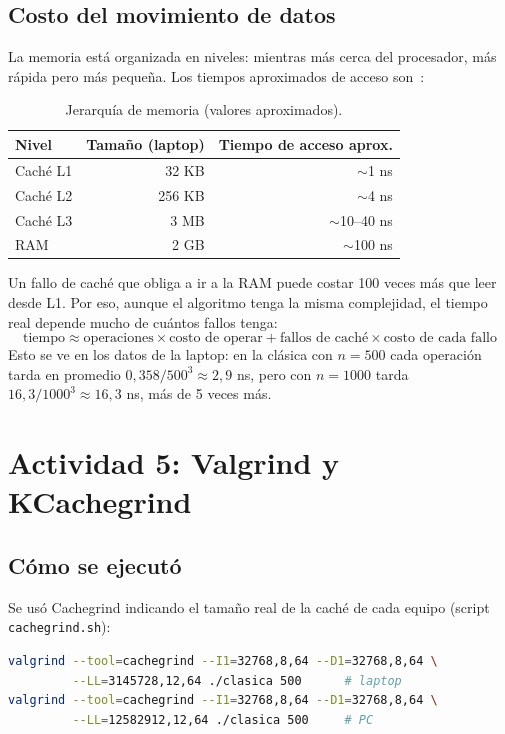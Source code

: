 \documentclass[11pt]{article}
\begin{document}
\subsection{Costo del movimiento de datos}

La memoria está organizada en niveles: mientras más cerca del procesador, más
rápida pero más pequeña. Los tiempos aproximados de acceso son~\cite{hennessy}:

\begin{table}[H]
\centering
\caption{Jerarquía de memoria (valores aproximados).}
\begin{tabular}{lrr}
\toprule
Nivel & Tamaño (laptop) & Tiempo de acceso aprox. \\
\midrule
Caché L1 & 32 KB  & $\sim$1 ns \\
Caché L2 & 256 KB & $\sim$4 ns \\
Caché L3 & 3 MB   & $\sim$10--40 ns \\
RAM      & 2 GB   & $\sim$100 ns \\
\bottomrule
\end{tabular}
\end{table}

Un fallo de caché que obliga a ir a la RAM puede costar 100 veces más que
leer desde L1. Por eso, aunque el algoritmo tenga la misma complejidad, el
tiempo real depende mucho de cuántos fallos tenga:
\[
\text{tiempo} \approx \text{operaciones} \times \text{costo de operar} +
\text{fallos de caché} \times \text{costo de cada fallo}
\]
Esto se ve en los datos de la laptop: en la clásica con $n=500$ cada
operación tarda en promedio $0{,}358 / 500^3 \approx 2{,}9$ ns, pero con
$n=1000$ tarda $16{,}3 / 1000^3 \approx 16{,}3$ ns, más de 5 veces más.

\section{Actividad 5: Valgrind y KCachegrind}

\subsection{Cómo se ejecutó}

Se usó Cachegrind indicando el tamaño real de la caché de cada equipo
(script \texttt{cachegrind.sh}):

\begin{lstlisting}[language=bash,numbers=none]
valgrind --tool=cachegrind --I1=32768,8,64 --D1=32768,8,64 \
         --LL=3145728,12,64 ./clasica 500      # laptop
valgrind --tool=cachegrind --I1=32768,8,64 --D1=32768,8,64 \
         --LL=12582912,12,64 ./clasica 500     # PC
\end{lstlisting}
\end{document}

